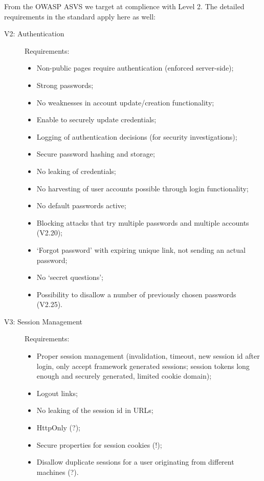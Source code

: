 \documentclass{report}
\begin{document}
From the OWASP ASVS we target at complience with Level 2. The detailed requirements
in the standard \cite{owasp2014:asvs} apply here as well:
\begin{description}

\item[V2: Authentication] Requirements:
\begin{itemize}
\item Non-public pages require authentication (enforced server-side); 
\item Strong passwords; 
\item No weaknesses in account update/creation functionality; 
\item Enable to securely update credentials; 
\item Logging of authentication decisions (for security investigations);
\item Secure password hashing and storage;
\item No leaking of credentials;
\item No harvesting of user accounts possible through login functionality;
\item No default passwords active;
\item Blocking attacks that try multiple passwords and multiple accounts (V2.20);
\item `Forgot password' with expiring unique link, not sending an actual password;
\item No `secret questions';
\item Possibility to disallow a number of previously chosen passwords (V2.25).
\end{itemize}

\item[V3: Session Management] Requirements:
\begin{itemize}
\item Proper session management (invalidation, timeout, new session id after login,
only accept framework generated sessions; session tokens long enough and securely generated,
limited cookie domain);
\item Logout links;
\item No leaking of the session id in URLs;
\item HttpOnly (?);
\item Secure properties for session cookies (!);
\item Disallow duplicate sessions for a user originating from different machines (?).
\end{itemize}


\end{description}
\end{document}
